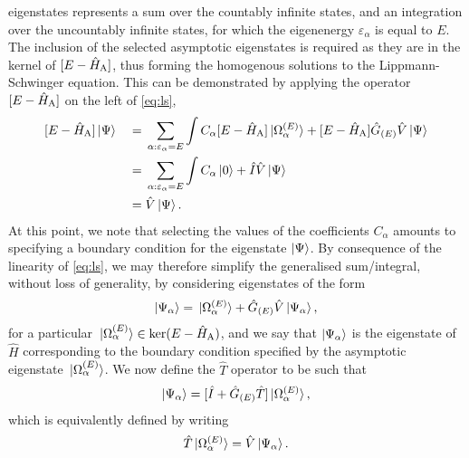 \documentclass[draft]{article}
\begin{document}
eigenstates represents a sum over the countably infinite states, and an
integration over the uncountably infinite states, for which the eigenenergy
$\varepsilon_{\alpha}$ is equal to $E$.
The inclusion of the selected asymptotic eigenstates is required as they are in
the kernel of $[E - \hat{H}_{\rm{A}}]$, thus forming the homogenous
solutions to the Lippmann-Schwinger equation.
This can be demonstrated by applying the operator $[E - \hat{H}_{\rm{A}}]$
on the left of \autoref{eq:ls},
\begin{alignat*}{2}
  &
  [
    E
    -
    \hat{H}_{\rm{A}}
  ]
  \ket{\Psi}
  &
  {}={}
  &
  \sum_{\alpha : \varepsilon_{\alpha} = E}\int
  C_{\alpha}
  [
    E
    -
    \hat{H}_{\rm{A}}
  ]
  \ket*{\Omega_{\alpha}^{(E)}}
  +
  [
    E
    -
    \hat{H}_{\rm{A}}
  ]
  \hat{G}_{(E)}
  \hat{V}
  \ket{\Psi}
  \\
  &
  &
  {}={}
  &
  \sum_{\alpha : \varepsilon_{\alpha} = E}\int
  C_{\alpha}
  \ket{0}
  +
  \hat{I}
  \hat{V}
  \ket{\Psi}
  \\
  &
  &
  {}={}
  &
  \hat{V}
  \ket{\Psi}
  .
\end{alignat*}
At this point, we note that selecting the values of the coefficients
$C_{\alpha}$ amounts to specifying a boundary condition for the eigenstate
$\ket{\Psi}$.
By consequence of the linearity of \autoref{eq:ls}, we may therefore simplify
the generalised sum/integral, without loss of generality, by considering
eigenstates of the form
\begin{equation}
  \label{eq:ls-boundary}
  \ket{\Psi_{\alpha}}
  =
  \ket*{\Omega_{\alpha}^{(E)}}
  +
  \hat{G}_{(E)}
  \hat{V}
  \ket{\Psi_{\alpha}}
  ,
\end{equation}
for a particular
$\ket*{\Omega_{\alpha}^{(E)}} \in \ker(E - \hat{H}_{\rm{A}})$, and we say
that $\ket{\Psi_{\alpha}}$ is the eigenstate of $\hat{H}$ corresponding to the
boundary condition specified by the asymptotic eigenstate
$\ket*{\Omega_{\alpha}^{(E)}}$.
We now define the $\hat{T}$ operator to be such that
\begin{equation}
  \label{eq:t-operator}
  \ket{\Psi_{\alpha}}
  =
  [
    \hat{I}
    +
    \hat{G}_{(E)}
    \hat{T}
  ]
  \ket*{\Omega_{\alpha}^{(E)}}
  ,
\end{equation}
which is equivalently defined by writing
\begin{equation}
  \label{eq:t-operator-v}
  \hat{T}
  \ket*{\Omega_{\alpha}^{(E)}}
  =
  \hat{V}
  \ket{\Psi_{\alpha}}
  .
\end{equation}
\end{document}
